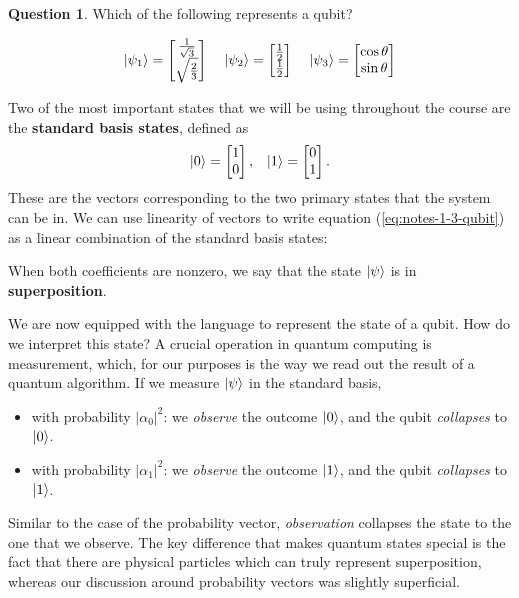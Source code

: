 \documentclass[letterpaper, 12pt]{article}
\newcommand{\1}{\mathds{1}}	%
\theoremstyle{definition}
\newtheorem{question}{Question}
\begin{document}
\begin{question}
    Which of the following represents a qubit? 

    \begin{equation}
        \ket{\psi_1} = \begin{bmatrix}
            \frac{1}{\sqrt{3}} \\ \sqrt{\frac{2}{3}}
        \end{bmatrix} \;\;\;\; 
        \ket{\psi_2} = \begin{bmatrix}
            \frac{1}{2} \\ \frac{1}{2}
        \end{bmatrix} \;\;\;\; 
        \ket{\psi_3} = \begin{bmatrix}
            \cos\theta \\ \sin \theta
        \end{bmatrix}
    \end{equation}
\end{question}

\newpage 

Two of the most important states that we will be using throughout the course are the \textbf{standard basis states}, defined as 
\begin{equation}
    \ket{0} = \begin{bmatrix}
        1 \\ 0
    \end{bmatrix}, \;\;\; \ket{1} = \begin{bmatrix}
        0 \\ 1
    \end{bmatrix}.
\end{equation}
These are the vectors corresponding to the two primary states that the system can be in. We can use linearity of vectors to write equation (\ref{eq:notes-1-3-qubit}) as a linear combination of the standard basis states:

\vspace{20mm}

When both coefficients are nonzero, we say that the state $\ket{\psi}$ is in \textbf{superposition}. 

We are now equipped with the language to represent the state of a qubit. How do we interpret this state? A crucial operation in quantum computing is measurement, which, for our purposes is the way we read out the result of a quantum algorithm. If we measure $\ket{\psi}$ in the standard basis, 
\begin{itemize}
    \item with probability $|\alpha_0|^2$: we \textit{observe} the outcome $\ket{0}$, and the qubit \textit{collapses} to $\ket{0}$.
    \item with probability $|\alpha_1|^2$: we \textit{observe} the outcome $\ket{1}$, and the qubit \textit{collapses} to $\ket{1}$.
\end{itemize}
Similar to the case of the probability vector, \textit{observation} collapses the state to the one that we observe. The key difference that makes quantum states special is the fact that there are physical particles which can truly represent superposition, whereas our discussion around probability vectors was slightly superficial. 
\end{document}
